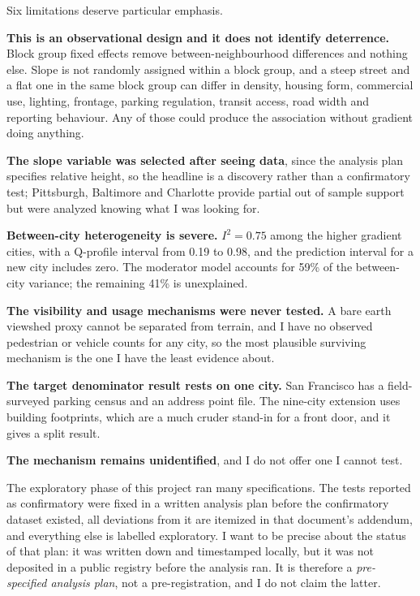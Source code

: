 \documentclass[11pt,letterpaper]{article}
\begin{document}
Six limitations deserve particular emphasis.

\textbf{This is an observational design and it does not identify deterrence.} Block
group fixed effects remove between-neighbourhood differences and nothing else. Slope
is not randomly assigned within a block group, and a steep street and a flat one in
the same block group can differ in density, housing form, commercial use, lighting,
frontage, parking regulation, transit access, road width and reporting behaviour. Any
of those could produce the association without gradient doing anything.

\textbf{The slope variable was selected after seeing data}, since the analysis plan
specifies relative height, so the headline is a discovery rather than a confirmatory
test; Pittsburgh, Baltimore and Charlotte provide partial out of sample support but
were analyzed knowing what I was looking for.

\textbf{Between-city heterogeneity is severe.} $I^2 = 0.75$ among the higher gradient
cities, with a Q-profile interval from 0.19 to 0.98, and the prediction interval for
a new city includes zero. The moderator model accounts for 59\% of the between-city
variance; the remaining 41\% is unexplained.

\textbf{The visibility and usage mechanisms were never tested.} A bare earth viewshed
proxy cannot be separated from terrain, and I have no observed pedestrian or vehicle
counts for any city, so the most plausible surviving mechanism is the one I have the
least evidence about.

\textbf{The target denominator result rests on one city.} San Francisco has a
field-surveyed parking census and an address point file. The nine-city extension uses
building footprints, which are a much cruder stand-in for a front door, and it gives a
split result.

\textbf{The mechanism remains unidentified}, and I do not offer one I cannot test.

The exploratory phase of this project ran many specifications. The tests reported as
confirmatory were fixed in a written analysis plan before the confirmatory dataset
existed, all deviations from it are itemized in that document's addendum, and
everything else is labelled exploratory. I want to be precise about the status of that
plan: it was written down and timestamped locally, but it was not deposited in a
public registry before the analysis ran. It is therefore a \emph{pre-specified
analysis plan}, not a pre-registration, and I do not claim the latter.
\end{document}
